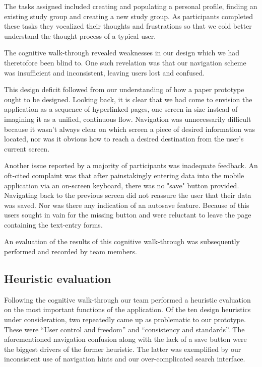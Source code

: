 \documentclass{sigchi-ext}
\begin{document}
The tasks assigned included creating and populating a personal profile, finding an existing study
group and creating a new study group. As participants completed these tasks they vocalized their
thoughts and frustrations so that we cold better understand the thought process of a typical user.

The cognitive walk-through revealed weaknesses in our design which we had theretofore been blind to.
One such revelation was that our navigation scheme was insufficient and inconsistent, leaving users
lost and confused.

This design deficit followed from our understanding of how a paper prototype
ought to be designed. Looking back, it is clear that we had come to envision
the application as a sequence of hyperlinked pages, one screen in size instead
of imagining it as a unified, continuous flow.  Navigation was unnecessarily
difficult because it wasn't always clear on which screen a piece of desired
information was located, nor was it obvious how to reach a desired destination
from the user's current screen.

Another issue reported by a majority of participants was inadequate feedback.
An oft-cited complaint was that after painstakingly entering data into the
mobile application via an on-screen keyboard, there was no "save" button
provided. Navigating back to the previous screen did not reassure the user that
their data was saved. Nor was there any indication of an autosave feature.
Because of this users sought in vain for the missing button and were reluctant
to leave the page containing the text-entry forms.

An evaluation of the results of this cognitive walk-through was subsequently
performed and recorded by team members.


\subsection{Heuristic evaluation}

Following the cognitive walk-through our team performed a heuristic evaluation on the most important
functions of the application. Of the ten design heuristics under consideration, two repeatedly came
up as problematic to our prototype. These were ``User control and freedom'' and ``consistency and
standards''. The aforementioned navigation confusion along with the lack of a save button were the
biggest drivers of the former heuristic. The latter was exemplified by our inconsistent use of
navigation hints and our over-complicated search interface.
\end{document}
